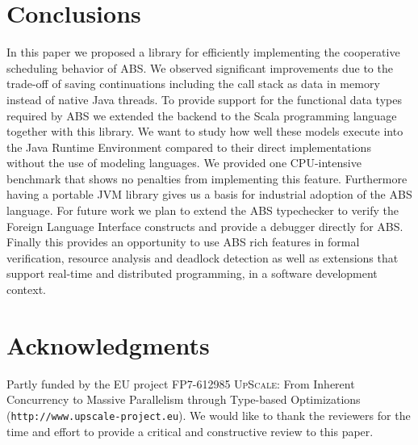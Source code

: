 \section{Conclusions}
\label{conc}
In this paper we proposed a library for efficiently implementing the cooperative scheduling behavior of ABS. We observed significant improvements due to the trade-off of saving continuations including the call stack as data in memory instead of native Java threads. To provide support for the functional data types required by ABS we extended the backend to the Scala programming language together with this library. We want to study how well these models execute into the Java Runtime Environment compared to their direct implementations without the use of modeling languages. We provided one CPU-intensive benchmark that shows no penalties from implementing this feature. Furthermore having a portable JVM library gives us a basis for industrial adoption of the ABS language. For future work we plan to extend the ABS typechecker to verify the Foreign Language Interface constructs and provide a debugger directly for ABS. Finally this provides an opportunity to use ABS rich features in formal verification,  resource analysis and deadlock detection as well as extensions that support real-time and distributed programming, in a software development context. 


\section{Acknowledgments}
Partly funded by the EU project FP7-612985
\textsc{UpScale}: From Inherent Concurrency to Massive Parallelism
through Type-based Optimizations \\ (\texttt{http:/$\!$/www.upscale-project.eu}). We would like to thank the reviewers for the time and effort to provide a critical and constructive review to this paper.

